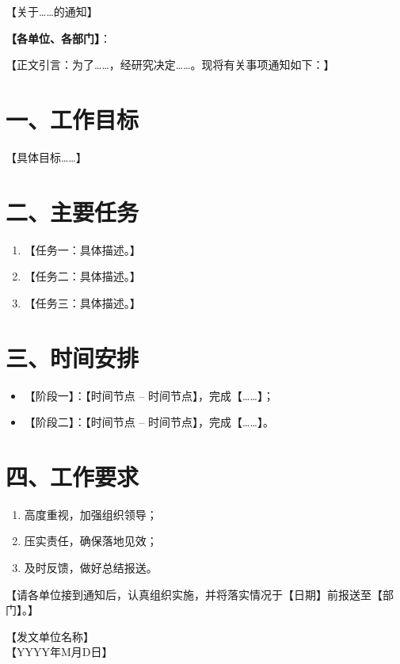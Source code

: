\documentclass[12pt,a4paper]{article}
\newcommand{\docTitle}[1]{%
  \begin{center}{\heiti\Large #1}\end{center}\vspace{0.5cm}}
\newcommand{\addressee}[1]{\noindent\textbf{#1}：\par}
\newcommand{\signature}[2]{\vspace{1cm}\begin{flushright}#1 \\ #2\end{flushright}}
\begin{document}
\docTitle{【关于……的通知】}

\addressee{【各单位、各部门】}

【正文引言：为了……，经研究决定……。现将有关事项通知如下：】

\section*{一、工作目标}
【具体目标……】

\section*{二、主要任务}
\begin{enumerate}[leftmargin=2em]
    \item 【任务一：具体描述。】
    \item 【任务二：具体描述。】
    \item 【任务三：具体描述。】
\end{enumerate}

\section*{三、时间安排}
\begin{itemize}[leftmargin=2em]
    \item 【阶段一】：【时间节点 -- 时间节点】，完成【……】；
    \item 【阶段二】：【时间节点 -- 时间节点】，完成【……】。
\end{itemize}

\section*{四、工作要求}
\begin{enumerate}[leftmargin=2em]
    \item 高度重视，加强组织领导；
    \item 压实责任，确保落地见效；
    \item 及时反馈，做好总结报送。
\end{enumerate}

【请各单位接到通知后，认真组织实施，并将落实情况于【日期】前报送至【部门】。】

\signature{【发文单位名称】}{【YYYY年M月D日】}
\end{document}
